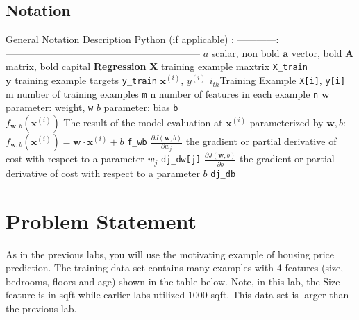 \documentclass[11pt]{article}
\begin{document}
    \hypertarget{notation}{%
\subsection{Notation}\label{notation}}

\textbar General Notation \textbar{} Description\textbar{} Python (if
applicable) \textbar{} \textbar: ------------\textbar:
------------------------------------------------------------\textbar\textbar{}
\textbar{} \(a\) \textbar{} scalar, non bold \textbar\textbar{}
\textbar{} \(\mathbf{a}\) \textbar{} vector, bold \textbar\textbar{}
\textbar{} \(\mathbf{A}\) \textbar{} matrix, bold capital
\textbar\textbar{} \textbar{} \textbf{Regression} \textbar{} \textbar{}
\textbar{} \textbar{} \textbar{} \(\mathbf{X}\) \textbar{} training
example maxtrix \textbar{} \texttt{X\_train} \textbar{}\\
\textbar{} \(\mathbf{y}\) \textbar{} training example targets \textbar{}
\texttt{y\_train} \textbar{} \(\mathbf{x}^{(i)}\), \(y^{(i)}\)
\textbar{} \(i_{th}\)Training Example \textbar{} \texttt{X{[}i{]}},
\texttt{y{[}i{]}}\textbar{} \textbar{} m \textbar{} number of training
examples \textbar{} \texttt{m}\textbar{} \textbar{} n \textbar{} number
of features in each example \textbar{} \texttt{n}\textbar{} \textbar{}
\(\mathbf{w}\) \textbar{} parameter: weight, \textbar{} \texttt{w}
\textbar{} \textbar{} \(b\) \textbar{} parameter: bias \textbar{}
\texttt{b} \textbar{}\\
\textbar{} \(f_{\mathbf{w},b}(\mathbf{x}^{(i)})\) \textbar{} The result
of the model evaluation at \(\mathbf{x}^{(i)}\) parameterized by
\(\mathbf{w},b\):
\(f_{\mathbf{w},b}(\mathbf{x}^{(i)}) = \mathbf{w} \cdot \mathbf{x}^{(i)}+b\)
\textbar{} \texttt{f\_wb} \textbar{}
\textbar{}\(\frac{\partial J(\mathbf{w},b)}{\partial w_j}\)\textbar{}
the gradient or partial derivative of cost with respect to a parameter
\(w_j\) \textbar{}\texttt{dj\_dw{[}j{]}}\textbar{}
\textbar{}\(\frac{\partial J(\mathbf{w},b)}{\partial b}\)\textbar{} the
gradient or partial derivative of cost with respect to a parameter
\(b\)\textbar{} \texttt{dj\_db}\textbar{}

    \hypertarget{problem-statement}{%
\section{Problem Statement}\label{problem-statement}}

As in the previous labs, you will use the motivating example of housing
price prediction. The training data set contains many examples with 4
features (size, bedrooms, floors and age) shown in the table below.
Note, in this lab, the Size feature is in sqft while earlier labs
utilized 1000 sqft. This data set is larger than the previous lab.
\end{document}

